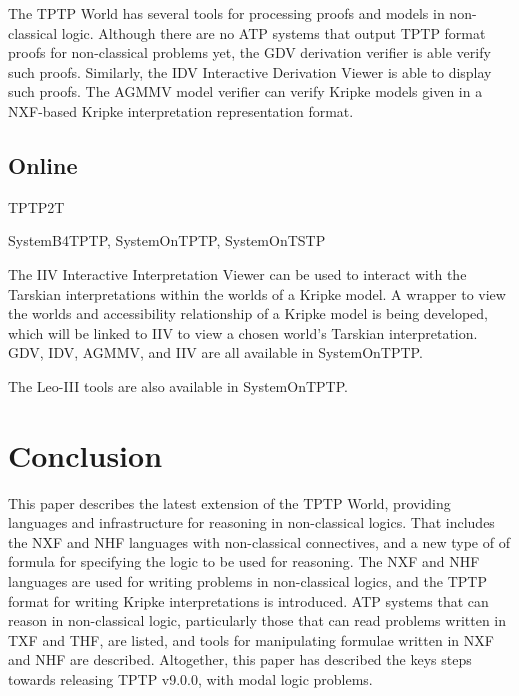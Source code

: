\documentclass[runningheads]{llncs}
\begin{document}
The TPTP World has several tools for processing proofs and models in non-classical logic.
Although there are no ATP systems that output TPTP format proofs for non-classical problems yet, the
GDV derivation verifier \cite{Sut06} is able verify such proofs.
Similarly, the IDV Interactive Derivation Viewer \cite{TPS07} is able to display such proofs.
The AGMMV model verifier can verify Kripke models given in a NXF-based Kripke interpretation
representation format.

\subsection{Online}
\label{Online}

TPTP2T \cite{}

SystemB4TPTP, SystemOnTPTP, SystemOnTSTP

The IIV Interactive Interpretation Viewer \cite{MS23-Poster} can be used to interact with the
Tarskian interpretations within the worlds of a Kripke model. 
A wrapper to view the worlds and accessibility relationship of a Kripke model is being developed,
which will be linked to IIV to view a chosen world's Tarskian interpretation.
GDV, IDV, AGMMV, and IIV are all available in SystemOnTPTP.

The Leo-III tools are also available in SystemOnTPTP.

\section{Conclusion}
\label{Conclusion}

This paper describes the latest extension of the TPTP World, providing languages and
infrastructure for reasoning in non-classical logics.
That includes the NXF and NHF languages with non-classical connectives, and a new type of
of formula for specifying the logic to be used for reasoning.
The NXF and NHF languages are used for writing problems in non-classical logics, and the
TPTP format for writing Kripke interpretations is introduced.
ATP systems that can reason in non-classical logic, particularly those that can read 
problems written in TXF and THF, are listed, and tools for manipulating formulae written in 
NXF and NHF are described.
Altogether, this paper has described the keys steps towards releasing TPTP v9.0.0,
with modal logic problems.
\end{document}

